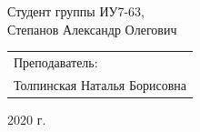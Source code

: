 \begin{titlepage}
\begin{center}
        Студент группы ИУ7-63,\\
        Степанов Александр Олегович
        \vfill
    \end{center}

    \begin{flushright}
        \large
        \begin{tabular}{l}
            Преподаватель: \\
            Толпинская Наталья Борисовна \\
        \end{tabular}
    \end{flushright}

   \begin{center}
        2020 г.
    \end{center}

\end{titlepage}

\tableofcontents
